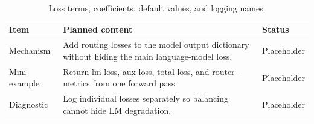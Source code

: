 \begin{table}[H]
\centering
\caption{Loss terms, coefficients, default values, and logging names.}
\label{tab:ch07-integrating-auxiliary-loss-into-training}
\begin{tabularx}{\textwidth}{p{}X p{}}
\toprule
Item & Planned content & Status \\
\midrule
Mechanism & Add routing losses to the model output dictionary without hiding the main language-model loss. & Placeholder \\
Mini-example & Return lm-loss, aux-loss, total-loss, and router-metrics from one forward pass. & Placeholder \\
Diagnostic & Log individual losses separately so balancing cannot hide LM degradation. & Placeholder \\
\bottomrule
\end{tabularx}
\end{table}

